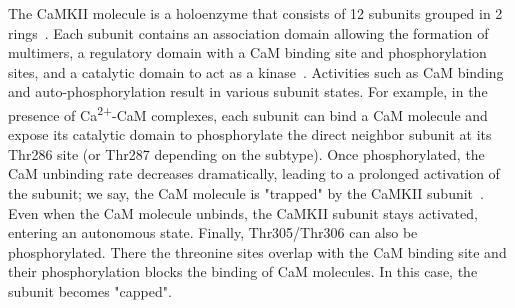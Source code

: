 \documentclass[10pt,letterpaper]{article}
\begin{document}
The CaMKII molecule is a holoenzyme that consists of 12 subunits grouped in 2 rings~\cite{Lisman:2002ki,Coultrap:2012ip,Stratton:2013el,Hell:2014bd}. Each subunit contains an association domain allowing the formation of multimers, a regulatory domain with a CaM binding site and phosphorylation sites, and a catalytic domain to act as a kinase~\cite{Lisman:2002ki,Coultrap:2012ip,Stratton:2013el,Hell:2014bd}. Activities such as CaM binding and auto-phosphorylation result in various subunit states. For example, in the presence of Ca\textsuperscript{2+}-CaM complexes, each subunit can bind a CaM molecule and expose its catalytic domain to phosphorylate the direct neighbor subunit at its Thr286 site (or Thr287 depending on the subtype). Once phosphorylated, the CaM unbinding rate decreases dramatically, leading to a prolonged activation of the subunit; we say, the CaM molecule is "trapped" by the CaMKII subunit~\cite{Meyer:1992dp}. Even when the CaM molecule unbinds, the CaMKII subunit stays activated, entering an autonomous state. Finally, Thr305/Thr306 can also be phosphorylated. There the threonine sites overlap with the CaM binding site and their phosphorylation blocks the binding of CaM molecules. In this case, the subunit becomes "capped". 
\end{document}
